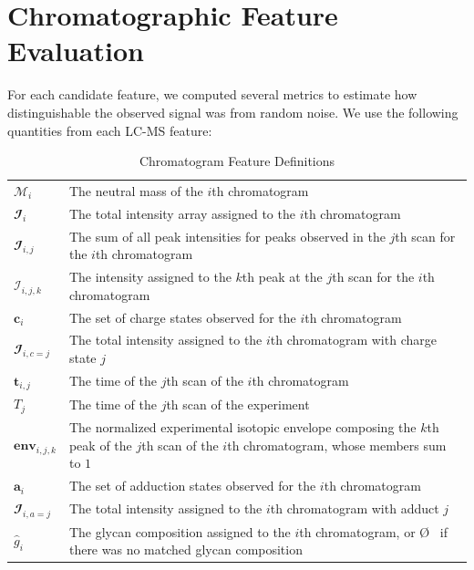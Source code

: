\section{Chromatographic Feature Evaluation}\label{sec:feature_evaluation}
    For each candidate feature, we computed several metrics to estimate how distinguishable
    the observed signal was from random noise. We use the following quantities from each LC-MS
    feature:

    \renewcommand{\arraystretch}{1.5}
    \begin{table}
        \caption{Chromatogram Feature Definitions}\label{tbl:chromatogram_feature_definitions}
        \centering
        \begin{tabular}{l | p{9cm}}
            \hline
            $\mathcal{M}_i$          & The neutral mass of the $i$th chromatogram\\
            $\mathbfcal{I}_i$        & The total intensity array assigned to the $i$th chromatogram\\
            $\mathbfcal{I}_{i, j}$   & The sum of all peak intensities for peaks observed in
                                       the $j$th scan for the $i$th chromatogram\\
            $\mathcal{I}_{i, j, k}$  & The intensity assigned to the $k$th peak at the $j$th
                                       scan for the $i$th chromatogram\\
            $\mathbf{c}_i$           & The set of charge states observed for the $i$th chromatogram\\
            $\mathbfcal{I}_{i, c=j}$ & The total intensity assigned to the $i$th chromatogram
                                       with charge state $j$\\
            $\mathbf{t}_{i, j}$      & The time of the $j$th scan of the $i$th chromatogram\\
            $T_j$                    & The time of the $j$th scan of the experiment\\
            $\textbf{env}_{i, j, k}$ & The normalized experimental isotopic envelope composing
                                       the $k$th peak of the $j$th scan of the $i$th chromatogram,
                                       whose members sum to $1$\\
            $\mathbf{a}_i$           & The set of adduction states observed for the $i$th chromatogram\\
            $\mathbfcal{I}_{i, a=j}$ & The total intensity assigned to the $i$th
                                       chromatogram with adduct $j$\\
            ${\hat g}_i$             & The glycan composition assigned to the $i$th chromatogram, or \O
                                       \ if there was no matched glycan composition
        \end{tabular}
    \end{table}
    \renewcommand{\arraystretch}{1.0}

